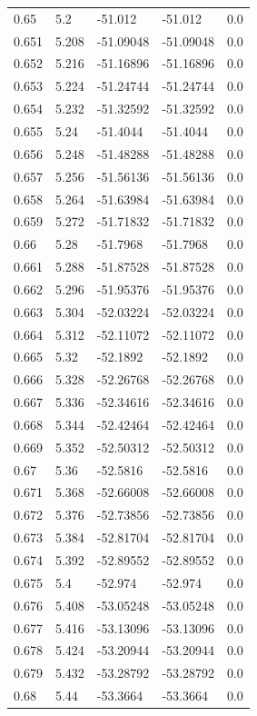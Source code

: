 \begin{tabular}{lllll}
0.65 & 5.2 & -51.012 & -51.012 & 0.0 \\
0.651 & 5.208 & -51.09048 & -51.09048 & 0.0 \\
0.652 & 5.216 & -51.16896 & -51.16896 & 0.0 \\
0.653 & 5.224 & -51.24744 & -51.24744 & 0.0 \\
0.654 & 5.232 & -51.32592 & -51.32592 & 0.0 \\
0.655 & 5.24 & -51.4044 & -51.4044 & 0.0 \\
0.656 & 5.248 & -51.48288 & -51.48288 & 0.0 \\
0.657 & 5.256 & -51.56136 & -51.56136 & 0.0 \\
0.658 & 5.264 & -51.63984 & -51.63984 & 0.0 \\
0.659 & 5.272 & -51.71832 & -51.71832 & 0.0 \\
0.66 & 5.28 & -51.7968 & -51.7968 & 0.0 \\
0.661 & 5.288 & -51.87528 & -51.87528 & 0.0 \\
0.662 & 5.296 & -51.95376 & -51.95376 & 0.0 \\
0.663 & 5.304 & -52.03224 & -52.03224 & 0.0 \\
0.664 & 5.312 & -52.11072 & -52.11072 & 0.0 \\
0.665 & 5.32 & -52.1892 & -52.1892 & 0.0 \\
0.666 & 5.328 & -52.26768 & -52.26768 & 0.0 \\
0.667 & 5.336 & -52.34616 & -52.34616 & 0.0 \\
0.668 & 5.344 & -52.42464 & -52.42464 & 0.0 \\
0.669 & 5.352 & -52.50312 & -52.50312 & 0.0 \\
0.67 & 5.36 & -52.5816 & -52.5816 & 0.0 \\
0.671 & 5.368 & -52.66008 & -52.66008 & 0.0 \\
0.672 & 5.376 & -52.73856 & -52.73856 & 0.0 \\
0.673 & 5.384 & -52.81704 & -52.81704 & 0.0 \\
0.674 & 5.392 & -52.89552 & -52.89552 & 0.0 \\
0.675 & 5.4 & -52.974 & -52.974 & 0.0 \\
0.676 & 5.408 & -53.05248 & -53.05248 & 0.0 \\
0.677 & 5.416 & -53.13096 & -53.13096 & 0.0 \\
0.678 & 5.424 & -53.20944 & -53.20944 & 0.0 \\
0.679 & 5.432 & -53.28792 & -53.28792 & 0.0 \\
0.68 & 5.44 & -53.3664 & -53.3664 & 0.0 \\

\end{tabular}
